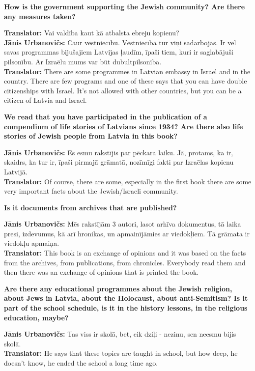 \textbf{How is the government supporting the Jewish community? Are there any measures taken?} 

\textbf{Translator:} Vai valdība kaut kā atbalsta ebreju kopienu?\\
\textbf{Jānis Urbanovičs:} Caur vēstniecību. Vēstniecībā tur viņi sadarbojas. Ir vēl savas programmas bijušajiem Latvijas ļaudīm, īpaši tiem, kuri ir saglabājuši pilsonību. Ar Izraēlu mums var būt dubultpilsonība.\\
\textbf{Translator:} There are some programmes in Latvian embassy in Israel and in the country. There are few programs and one of these says that you can have double citizenships with Israel. It’s not allowed with other countries, but you can be a citizen of Latvia and Israel.  

\textbf{We read that you have participated in the publication of a compendium of life stories of Latvians since 1934? Are there also life stories of Jewish people from Latvia in this book?} 

\textbf{Jānis Urbanovičs:} Es esmu rakstījis par pēckara laiku. Jā, protams, ka ir, skaidrs, ka tur ir, īpaši pirmajā grāmatā, nozīmīgi fakti par Izraēlas kopienu Latvijā.\\  
\textbf{Translator:} Of course, there are some, especially in the first book there are some very important facts about the Jewish/Israeli community.  

\textbf{Is it documents from archives that are published?}  

\textbf{Jānis Urbanovičs:} Mēs rakstījām 3 autori, lasot arhīva dokumentus, tā laika presi, izdevumus, kā arī hronikas, un apmainījāmies ar viedokļiem. Tā grāmata ir viedokļu apmaiņa.\\  
\textbf{Translator:} This book is an exchange of opinions and it was based on the facts from the archives, from publications, from chronicles. Everybody read them and then there was an exchange of opinions that is printed the book. 

\textbf{Are there any educational programmes about the Jewish religion, about Jews in Latvia, about the Holocaust, about anti-Semitism? Is it part of the school schedule, is it in the history lessons, in the religious education, maybe?}  

\textbf{Jānis Urbanovičs:} Tas viss ir skolā, bet, cik dziļi - nezinu, sen neesmu bijis skolā.\\  
\textbf{Translator:} He says that these topics are taught in school, but how deep, he doesn't know, he ended the school a long time ago. 


